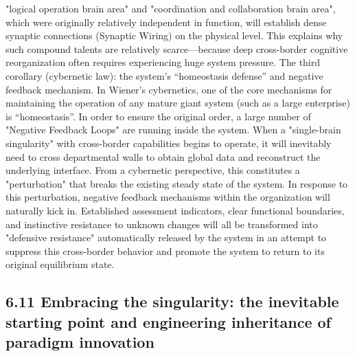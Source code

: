 \documentclass[11pt,a4paper]{article}
\begin{document}
"logical operation brain area" and "coordination and collaboration brain area", which were originally relatively independent in function, will establish dense synaptic connections (Synaptic Wiring) on the physical level. This explains why such compound talents are relatively scarce—because deep cross-border cognitive reorganization often requires experiencing huge system pressure. The third corollary (cybernetic law): the system’s “homeostasis defense” and negative feedback mechanism. In Wiener’s cybernetics, one of the core mechanisms for maintaining the operation of any mature giant system (such as a large enterprise) is “homeostasis”. In order to ensure the original order, a large number of "Negative Feedback Loops" are running inside the system. When a "single-brain singularity" with cross-border capabilities begins to operate, it will inevitably need to cross departmental walls to obtain global data and reconstruct the underlying interface. From a cybernetic perspective, this constitutes a "perturbation" that breaks the existing steady state of the system. In response to this perturbation, negative feedback mechanisms within the organization will naturally kick in. Established assessment indicators, clear functional boundaries, and instinctive resistance to unknown changes will all be transformed into "defensive resistance" automatically released by the system in an attempt to suppress this cross-border behavior and promote the system to return to its original equilibrium state.


\subsection*{6.11 Embracing the singularity: the inevitable starting point and engineering inheritance of paradigm innovation}
\end{document}
